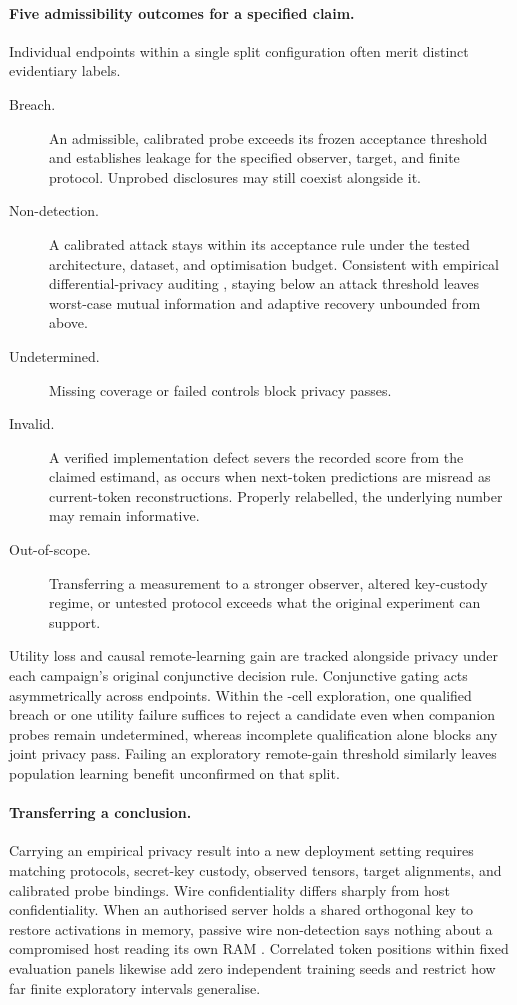 \paragraph{Five admissibility outcomes for a specified claim.}
Individual endpoints within a single split configuration often merit
distinct evidentiary labels.
\begin{description}
  \item[Breach.] An admissible, calibrated probe exceeds its frozen
    acceptance threshold and establishes leakage for the specified observer,
    target, and finite protocol. Unprobed disclosures may still coexist
    alongside it.
  \item[Non-detection.] A calibrated attack stays within its acceptance rule
    under the tested architecture, dataset, and optimisation budget.
    Consistent with empirical differential-privacy auditing
    \cite{jagielski2020}, staying below an attack threshold leaves
    worst-case mutual information and adaptive recovery unbounded from above.
  \item[Undetermined.] Missing coverage or failed controls block privacy
    passes.
  \item[Invalid.] A verified implementation defect severs the recorded score
    from the claimed estimand, as occurs when next-token predictions are
    misread as current-token reconstructions. Properly relabelled, the
    underlying number may remain informative.
  \item[Out-of-scope.] Transferring a measurement to a stronger observer,
    altered key-custody regime, or untested protocol exceeds what the
    original experiment can support.
\end{description}

Utility loss and causal remote-learning gain are tracked alongside privacy
under each campaign's original conjunctive decision rule. Conjunctive gating
acts asymmetrically across endpoints. Within the \RoneCells-cell
exploration, one qualified breach or one utility failure suffices to reject
a candidate even when companion probes remain undetermined, whereas
incomplete qualification alone blocks any joint privacy pass. Failing an
exploratory remote-gain threshold similarly leaves population learning
benefit unconfirmed on that split.

\paragraph{Transferring a conclusion.}
Carrying an empirical privacy result into a new deployment setting requires
matching protocols, secret-key custody, observed tensors, target alignments,
and calibrated probe bindings. Wire confidentiality differs sharply from
host confidentiality. When an authorised server holds a shared orthogonal
key to restore activations in memory, passive wire non-detection says
nothing about a compromised host reading its own RAM \cite{permattack2025}.
Correlated token positions within fixed evaluation panels likewise add zero
independent training seeds and restrict how far finite exploratory
intervals generalise.

